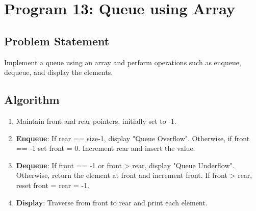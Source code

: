 \documentclass[a4paper,12pt]{article}
\begin{document}
\newpage

\section*{Program 13: Queue using Array}

\subsection*{Problem Statement}
Implement a queue using an array and perform operations such as enqueue, dequeue, and display the elements.

\subsection*{Algorithm}
\begin{enumerate}
    \item Maintain front and rear pointers, initially set to -1.
    \item \textbf{Enqueue}: If rear == size-1, display "Queue Overflow". Otherwise, if front == -1 set front = 0. Increment rear and insert the value.
    \item \textbf{Dequeue}: If front == -1 or front > rear, display "Queue Underflow". Otherwise, return the element at front and increment front. If front > rear, reset front = rear = -1.
    \item \textbf{Display}: Traverse from front to rear and print each element.
\end{enumerate}
\end{document}
